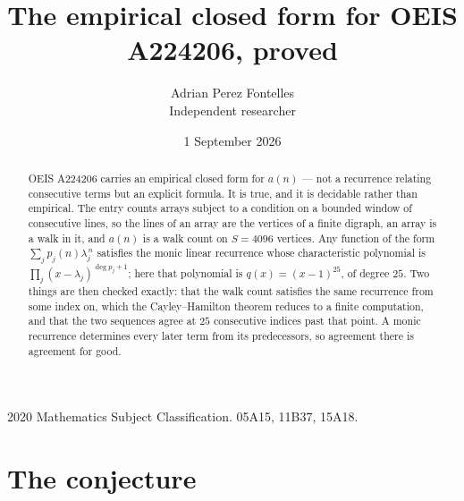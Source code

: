 \documentclass[11pt,a4paper]{article}
\title{The empirical closed form for OEIS A224206, proved}
\author{Adrian Perez Fontelles\\ \small Independent researcher}
\date{1 September 2026}
\theoremstyle{plain}
\theoremstyle{definition}
\begin{document}
\maketitle

\begin{abstract}
OEIS A224206 carries an empirical closed form for $a(n)$ --- not a recurrence relating
consecutive terms but an explicit formula. It is true, and it is decidable rather than
empirical. The entry counts arrays subject to a condition on a bounded window of consecutive lines, so the lines of an array are the
vertices of a finite digraph, an array is a walk in it, and $a(n)$ is a walk count on
$S=4096$ vertices. Any function of the form $\sum_j p_j(n)\lambda_j^{\,n}$ satisfies the
monic linear recurrence whose characteristic polynomial is
$\prod_j(x-\lambda_j)^{\deg p_j+1}$; here that polynomial is $q(x)=(x-1)^{25}$, of degree
$25$. Two things are then checked exactly: that the walk count satisfies the same
recurrence from some index on, which the Cayley--Hamilton theorem reduces to a finite
computation, and that the two sequences agree at $25$ consecutive indices past that
point. A monic recurrence determines every later term from its predecessors, so agreement
there is agreement for good.
\end{abstract}

\noindent\small 2020 Mathematics Subject Classification. 05A15, 11B37, 15A18.\normalsize

\section{The conjecture}
\end{document}
